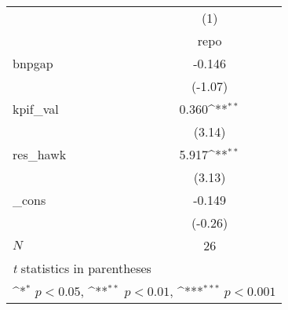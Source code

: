 {
\def\sym#1{\ifmmode^{#1}\else\(^{#1}\)\fi}
\begin{tabular}{l*{1}{c}}
\hline\hline
            &\multicolumn{1}{c}{(1)}\\
            &\multicolumn{1}{c}{repo}\\
\hline
bnpgap      &      -0.146         \\
            &     (-1.07)         \\
[1em]
kpif\_val    &       0.360\sym{**} \\
            &      (3.14)         \\
[1em]
res\_hawk    &       5.917\sym{**} \\
            &      (3.13)         \\
[1em]
\_cons      &      -0.149         \\
            &     (-0.26)         \\
\hline
\(N\)       &          26         \\
\hline\hline
\multicolumn{2}{l}{\footnotesize \textit{t} statistics in parentheses}\\
\multicolumn{2}{l}{\footnotesize \sym{*} \(p<0.05\), \sym{**} \(p<0.01\), \sym{***} \(p<0.001\)}\\
\end{tabular}
}

